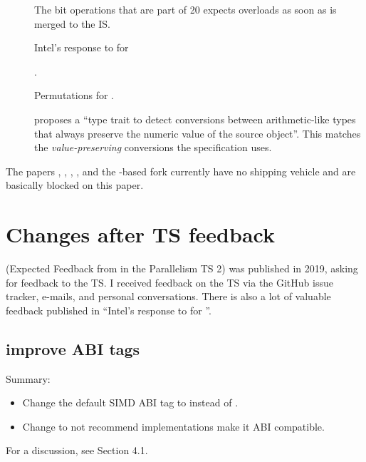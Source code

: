 \begin{description}
  \item[] The bit operations that are part of \CC{}20 expects  overloads as soon as  is merged to the IS.

  \item[] Intel’s response to  for 

  \item[] .

  \item[] Permutations for .

  \item[] \textcite{P2509R0} proposes a ``type trait to detect
    conversions between arithmetic-like types that always preserve the numeric
    value of the source object''. This matches the \textit{value-preserving}
    conversions the  specification uses.
\end{description}
The papers , , , , and
the -based  fork currently have no shipping vehicle
and are basically blocked on this paper.

\section{Changes after TS feedback}\label{sec:changes}
\cite{P1915R0} (Expected Feedback from  in the Parallelism TS 2) was published in 2019, asking for feedback to the TS.
I received feedback on the TS via the GitHub issue tracker, e-mails, and personal conversations.
There is also a lot of valuable feedback published in  ``Intel’s response to  for ''.

\subsection{improve ABI tags}
Summary:
\begin{itemize}
  \item Change the default SIMD ABI tag to \simdabi{} instead of \simdabi{}.
  \item Change \simdabi{} to not recommend implementations make it ABI compatible.
\end{itemize}

For a discussion, see  Section 4.1.

